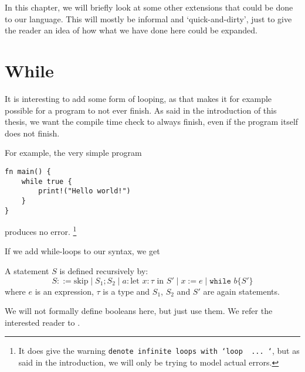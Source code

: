 In this chapter, we will briefly look at some other extensions that could be done to our language. This will mostly be informal and `quick-and-dirty', just to give the reader an idea of how what we have done here could be expanded. 

\section{While}
It is interesting to add some form of looping, as that makes it for example possible for a program to not ever finish. As said in the introduction of this thesis, we want the compile time check to always finish, even if the program itself does not finish. 

For example, the very simple program 

\begin{verbatim}
fn main() {
    while true {
        print!("Hello world!")
    }
}
\end{verbatim}

produces no error. \footnote{It does give the warning \texttt{denote infinite loops with `loop { ... }`}, but as said in the introduction, we will only be trying to model actual errors.}

If we add while-loops to our syntax, we get 

\begin{definition}
\label{statementswhile}
A statement $S$ is defined recursively by:
$$S ::= \textrm{skip} \mid S_1; S_2 \mid a: \textrm{let } x:\tau \textrm{ in } S' \mid x := e \mid \texttt{while } b \{ S' \}$$
where $e$ is an expression, $\tau$ is a type and $S_1$, $S_2$ and $S'$ are again statements.
\end{definition}

We will not formally define booleans here, but just use them. We refer the interested reader to \cite{nielson1992semantics}.


